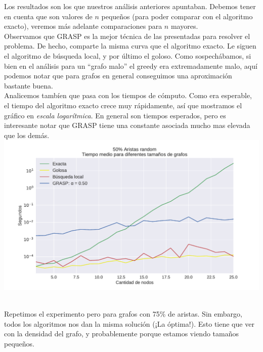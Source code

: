 Los resultados son los que nuestros análisis anteriores apuntaban. Debemos tener en cuenta que son valores de $n$ pequeños (para poder comparar con el algoritmo exacto), veremos más adelante comparaciones para $n$ mayores. \\

Observamos que GRASP es la mejor técnica de las presentadas para resolver el problema. De hecho, comparte la misma curva que el algoritmo exacto. Le siguen el algoritmo de búsqueda local, y por último el goloso. Como sospechábamos, si bien en el análisis para un ``grafo malo'' el greedy era extremadamente malo, aquí podemos notar que para grafos en general conseguimos una aproximación bastante buena. \\

Analicemos tambíen que pasa con los tiempos de cómputo. Como era esperable, el tiempo del algoritmo exacto crece muy rápidamente, así que mostramos el gráfico en \textit{escala logarítmica}. En general son tiempos esperados, pero es interesante notar que GRASP tiene una constante asociada mucho mas elevada que los demás. \\

{\centering
    \includegraphics[width=1\textwidth]{informe/imgs/exp_random50_tiempo_todos_v2.pdf}
}
$ $ \newline

Repetimos el experimento pero para grafos con 75\% de aristas. Sin embargo, todos los algoritmos nos dan la misma solución (¡La óptima!). Esto tiene que ver con la densidad del grafo, y probablemente porque estamos viendo tamaños pequeños. \\

